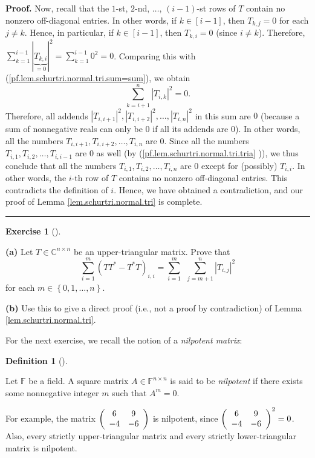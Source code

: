 \documentclass[numbers=enddot,12pt,final,onecolumn,notitlepage]{scrartcl}%
\newcounter{exer}
\numberwithin{exer}{subsection}
\theoremstyle{definition}
\newtheorem{defi}[theo]{Definition}
\newenvironment{definition}[1][]
{\begin{defi}[#1]\begin{leftbar}}
{\end{leftbar}\end{defi}}
\newtheorem{exmp}[exer]{Exercise}
\newenvironment{exercise}[1][]
{\begin{exmp}[#1]\begin{leftbar}}
{\end{leftbar}\end{exmp}}
\newenvironment{proof}[1][Proof]{\noindent\textbf{#1.} }{\ \rule{0.5em}{0.5em}}
\let\sumnonlimits\sum
\renewcommand{\sum}{\sumnonlimits\limits}
\begin{document}
\begin{proof}
Now, recall that the $1$-st, $2$-nd, $\ldots$, $\left(  i-1\right)  $-st rows
of $T$ contain no nonzero off-diagonal entries. In other words, if
$k\in\left[  i-1\right]  $, then $T_{k,j}=0$ for each $j\neq k$. Hence, in
particular, if $k\in\left[  i-1\right]  $, then $T_{k,i}=0$ (since $i\neq k$).
Therefore, $\sum_{k=1}^{i-1}\left\vert \underbrace{T_{k,i}}_{=0}\right\vert
^{2}=\sum_{k=1}^{i-1}0^{2}=0$. Comparing this with
(\ref{pf.lem.schurtri.normal.tri.sum=sum}), we obtain%
\[
\sum_{k=i+1}^{n}\left\vert T_{i,k}\right\vert ^{2}=0.
\]
Therefore, all addends $\left\vert T_{i,i+1}\right\vert ^{2},\left\vert
T_{i,i+2}\right\vert ^{2},\ldots,\left\vert T_{i,n}\right\vert ^{2}$ in this
sum are $0$ (because a sum of nonnegative reals can only be $0$ if all its
addends are $0$). In other words, all the numbers $T_{i,i+1},T_{i,i+2}%
,\ldots,T_{i,n}$ are $0$. Since all the numbers $T_{i,1},T_{i,2}%
,\ldots,T_{i,i-1}$ are $0$ as well (by (\ref{pf.lem.schurtri.normal.tri.tria}%
)), we thus conclude that all the numbers $T_{i,1},T_{i,2},\ldots,T_{i,n}$ are
$0$ except for (possibly) $T_{i,i}$. In other words, the $i$-th row of $T$
contains no nonzero off-diagonal entries. This contradicts the definition of
$i$. Hence, we have obtained a contradiction, and our proof of Lemma
\ref{lem.schurtri.normal.tri} is complete.
\end{proof}

\begin{exercise}
\label{exe.schurtri.normal.tri.2} \textbf{(a)} Let $T\in
\mathbb{C}^{n\times n}$ be an upper-triangular matrix. Prove that%
\[
\sum_{i=1}^{m}\left(  TT^{\ast}-T^{\ast}T\right)  _{i,i}=\sum_{i=1}%
^{m}\ \ \sum_{j=m+1}^{n}\left\vert T_{i,j}\right\vert ^{2}%
\]
for each $m\in\left\{  0,1,\ldots,n\right\}  $. \medskip

\textbf{(b)} Use this to give a direct proof (i.e., not a proof by
contradiction) of Lemma \ref{lem.schurtri.normal.tri}.
\end{exercise}

For the next exercise, we recall the notion of a \emph{nilpotent matrix}:

\begin{definition}
Let $\mathbb{F}$ be a field. A square matrix $A\in\mathbb{F}^{n\times n}$ is
said to be \emph{nilpotent} if there exists some nonnegative integer $m$ such
that $A^{m}=0$.
\end{definition}

For example, the matrix $\left(
\begin{array}
[c]{cc}%
6 & 9\\
-4 & -6
\end{array}
\right)  $ is nilpotent, since $\left(
\begin{array}
[c]{cc}%
6 & 9\\
-4 & -6
\end{array}
\right)  ^{2}=0$. Also, every strictly upper-triangular matrix and every
strictly lower-triangular matrix is nilpotent.
\end{document}

